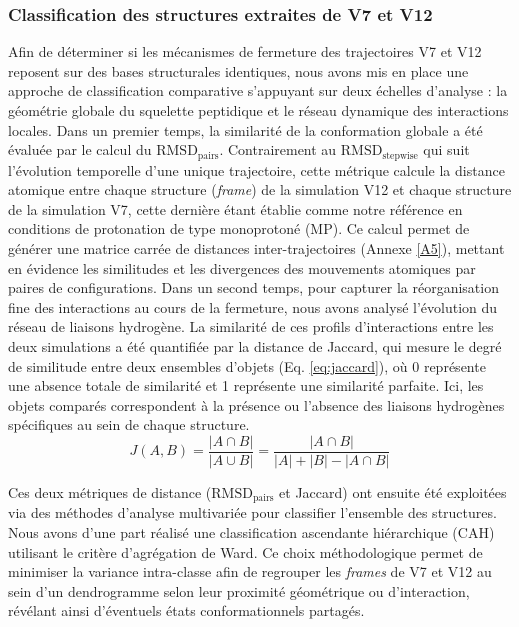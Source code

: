 \documentclass{isddmaster}
\begin{document}
	\subsubsection{Classification des structures extraites de V7 et V12}
	Afin de déterminer si les mécanismes de fermeture des trajectoires V7 et V12 reposent sur des bases structurales identiques, nous avons mis en place une approche de classification comparative s'appuyant sur deux échelles d'analyse : la géométrie globale du squelette peptidique et le réseau dynamique des interactions locales.
    Dans un premier temps, la similarité de la conformation globale a été évaluée par le calcul du $\text{RMSD}_{\text{pairs}}$. Contrairement au $\text{RMSD}_{\text{stepwise}}$ qui suit l'évolution temporelle d'une unique trajectoire, cette métrique calcule la distance atomique entre chaque structure (\textit{frame}) de la simulation V12 et chaque structure de la simulation V7, cette dernière étant établie comme notre référence en conditions de protonation de type monoprotoné (MP). Ce calcul permet de générer une matrice carrée de distances inter-trajectoires (Annexe \ref{A5}), mettant en évidence les similitudes et les divergences des mouvements atomiques par paires de configurations.
    Dans un second temps, pour capturer la réorganisation fine des interactions au cours de la fermeture, nous avons analysé l'évolution du réseau de liaisons hydrogène. La similarité de ces profils d'interactions entre les deux simulations a été quantifiée par la distance de Jaccard, qui mesure le degré de similitude entre deux ensembles d'objets (Eq. \ref{eq:jaccard}), où 0 représente une absence totale de similarité et 1 représente une similarité parfaite. Ici, les objets comparés correspondent à la présence ou l'absence des liaisons hydrogènes spécifiques au sein de chaque structure.
	\begin{equation}{}
		{\displaystyle J(A,B)={\frac {|A\cap B|}{|A\cup B|}}={\frac {|A\cap B|}{|A|+|B|-|A\cap B|}}}
		\label{eq:jaccard}
	\end{equation}

	Ces deux métriques de distance ($\text{RMSD}_{\text{pairs}}$ et Jaccard) ont ensuite été exploitées via des méthodes d'analyse multivariée pour classifier l'ensemble des structures. Nous avons d'une part réalisé une classification ascendante hiérarchique (CAH) utilisant le critère d'agrégation de Ward. Ce choix méthodologique permet de minimiser la variance intra-classe afin de regrouper les \textit{frames} de V7 et V12 au sein d'un dendrogramme selon leur proximité géométrique ou d'interaction, révélant ainsi d'éventuels états conformationnels partagés.
\end{document}
